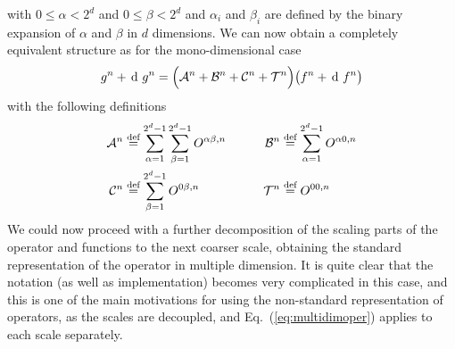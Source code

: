 with $0 \leq \alpha < 2^d$ and $0 \leq \beta < 2^d$ and $\alpha_i$ and $\beta_i$
are defined by the binary expansion of $\alpha$ and $\beta$ in $d$ dimensions.
We can now obtain a completely equivalent structure as for the mono-dimensional
case
\begin{equation}
    \label{eq:multidimoper}
    \scalingrep{g}{n} + \waveletrep{g}{n} = 
	\Big(\mathcal{A}^n + \mathcal{B}^n + \mathcal{C}^n + \mathcal{T}^n\Big)
	\big(\scalingrep{f}{n} + \waveletrep{f}{n}\big)
\end{equation} 
with the following definitions
\begin{eqnarray}
    \begin{split}
	\mathcal{A}^{n} &\stackrel{\text{def}}{\hbox{=}} 
        \sum_{\alpha=1}^{2^d-1} \sum_{\beta=1}^{2^d-1} O^{\alpha\beta,n} \qquad
	&\mathcal{B}^{n} &\stackrel{\text{def}}{\hbox{=}} 
	\sum_{\alpha=1}^{2^d-1} O^{\alpha 0,n} \\
	\mathcal{C}^{n} &\stackrel{\text{def}}{\hbox{=}} 
	\sum_{\beta=1}^{2^d-1} O^{0 \beta,n}
	&\mathcal{T}^{n} &\stackrel{\text{def}}{\hbox{=}} O^{00,n}
    \end{split}
\end{eqnarray}
We could now proceed with a further decomposition of the scaling parts of the
operator and functions to the next coarser scale, obtaining the standard
representation of the operator in multiple dimension. It is quite clear that the 
notation (as well as implementation) becomes very complicated in this case, and this
is one of the main motivations for using the non-standard representation of operators,
as the scales are decoupled, and Eq.~(\ref{eq:multidimoper}) applies to each scale
separately.

